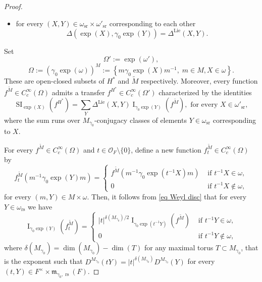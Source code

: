 \documentclass[12pt]{article}
\numberwithin{equation}{section}
\def\tM{\widetilde{M}}
\DeclareMathOperator{\Lie}{Lie}
\DeclareMathOperator{\rs}{rs}
\DeclareMathOperator{\sr}{sr}
\DeclareMathOperator{\SI}{\mathrm{SI}}
\DeclareMathOperator{\rI}{\mathrm{I}}
\begin{document}
\begin{proof}
\begin{itemize}
			\item for every $(X,Y)\in \omega_{\sr}\times \omega'_{\sr}$ corresponding to each other
			$$\Delta(\exp(X),\gamma_0\exp(Y))=\Delta^{\Lie}(X,Y).$$
		\end{itemize}
		
		Set
		$$\displaystyle \Omega':=\exp(\omega'),$$
		$$\displaystyle \Omega:=(\gamma_0 \exp(\omega))^M:=\left\{m\gamma_0 \exp(X)m^{-1},\; m\in M, X\in \omega\right\}.$$
		These are open-closed subsets of $H^*$ and $\tM$ respectively. Moreover, every function $f^{\tM}\in C_c^\infty(\Omega)$ admits a transfer $f^{H^*}\in C_c^\infty(\Omega')$ characterized by the identities
		\begin{equation}\label{transfer id lie alg}
			\displaystyle \SI_{\exp(X)}(f^{H^*})=\sum_{Y} \Delta^{\Lie}(X,Y) \rI_{\gamma_0 \exp(Y)}(f^{\tM}), \mbox{ for every } X\in \omega'_{\sr},
		\end{equation}
		where the sum runs over $M_{\gamma_0}$-conjugacy classes of elements $Y\in \omega_{\sr}$ corresponding to $X$.
		
		For every $f^{\tM}\in C_c^\infty(\Omega)$ and $t\in \mathcal{O}_F\setminus \{ 0\}$, define a new function $f^{\tM}_t\in C_c^\infty(\Omega)$ by
		$$\displaystyle f^{\tM}_t(m^{-1}\gamma_0 \exp(Y)m)=\left\{\begin{array}{ll}
			f^{\tM}(m^{-1}\gamma_0 \exp(t^{-1}X)m) & \mbox{ if } t^{-1}X\in \omega, \\
			0 & \mbox{ if } t^{-1}X\notin \omega,
		\end{array}
		\right.$$
		for every $(m,Y)\in M\times \omega$. Then, it follows from \eqref{eq Weyl disc} that for every $Y\in \omega_{\rs}$ we have
		\begin{equation}\label{eq1 orb int lie alg}
			\displaystyle \rI_{\gamma_0\exp(Y)}(f^{\tM}_t)=\left\{\begin{array}{ll}
				\lvert t\rvert^{\delta(M_{\gamma_0})/2} \rI_{\gamma_0\exp(t^{-1}Y)}(f^{\tM}) & \mbox{ if } t^{-1}Y\in \omega, \\
				0 & \mbox{ if } t^{-1}Y\notin\omega,
			\end{array} \right.
		\end{equation}
		where $\delta(M_{\gamma_0})=\dim(M_{\gamma_0})-\dim(T)$ for any maximal torus $T\subset M_{\gamma_0}$, that is the exponent such that $D^{M_{\gamma_0}}(tY)=\lvert t\rvert^{\delta(M_{\gamma_0})} D^{M_{\gamma_0}}(Y)$ for every $(t,Y)\in F^\times \times \mathfrak{m}_{\gamma_0,\rs}(F)$. 
		

\end{proof}
\end{document}
